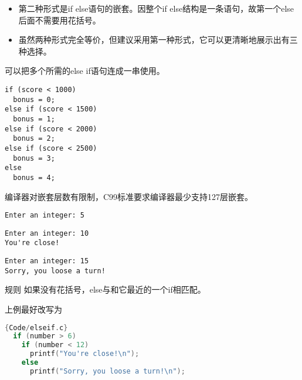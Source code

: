 \begin{frame}[fragile]
\begin{itemize}
\item
第二种形式是if else语句的嵌套。因\textcolor{acolor1}{整个if else结构是一条语句}，故第一个else后面不需要用花括号。\\[0.1in]
\item 
虽然两种形式完全等价，但建议采用第一种形式，它可以更清晰地展示出有三种选择。
\end{itemize}
\end{frame}


\begin{frame}[fragile]
可以把多个所需的else if语句连成一串使用。
\begin{lstlisting}
if (score < 1000)
  bonus = 0;
else if (score < 1500)
  bonus = 1;
else if (score < 2000)
  bonus = 2;
else if (score < 2500)
  bonus = 3;
else
  bonus = 4;    
\end{lstlisting}
\textcolor{acolor1}{编译器对嵌套层数有限制，C99标准要求编译器最少支持127层嵌套。}
\end{frame}

\begin{frame}[fragile]

\end{frame}

\begin{frame}[fragile]
\begin{lstlisting}
Enter an integer: 5
\end{lstlisting} \pause
 
\begin{lstlisting}
Enter an integer: 10
You're close!
\end{lstlisting} \pause 

\begin{lstlisting}
Enter an integer: 15
Sorry, you loose a turn!
\end{lstlisting}
\end{frame}

\begin{frame}[fragile]
\begin{block}{规则}
如果没有花括号，else与和它最近的一个if相匹配。
\end{block}
\end{frame}

\begin{frame}[fragile]
上例最好改写为
\begin{lstlisting}[language=c,frame=single]{Code/elseif.c}
  if (number > 6)
    if (number < 12)
      printf("You're close!\n");
    else
      printf("Sorry, you loose a turn!\n");
\end{lstlisting}
\end{frame}

